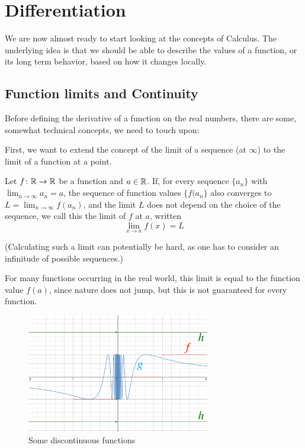 \chapter{Differentiation}
\label{chdiff}

We are now almost ready to start looking at the concepts of Calculus. The
underlying idea is that we should be able to describe the values of a
function, or its long term behavior, based on how it changes locally.

\section{Function limits and Continuity}

Before defining the derivative of a function on the real numbers, 
there are some, somewhat
technical concepts, we need to touch upon:

First, we want to extend the concept of the limit of a sequence (at
$\infty$) to the limit of a function at a point.
\begin{defn}
Let $f\colon{\mathbb R}\to{\mathbb R}$ be a function and $a\in{\mathbb R}$. If, for every sequence
$\{a_n\}$ with $\lim_{n\to\infty} a_n=a$, the sequence of function values
$\{f(a_n\}$ also converges to $L=\lim_{n\to\infty} f(a_n)$, and the limit
$L$ does not depend on the choice of the sequence, we call this the limit
of $f$ at $a$, written
\[
\lim_{x\to a} f(x)=L
\]
\end{defn}

(Calculating such a limit can potentially be hard, as one has to consider an
infinitude of possible sequences.)

For many functions occurring in the real world, this limit is equal to the
function value $f(a)$, since nature does not jump, but this is not
guaranteed for every function.

\begin{figure}[t]
\begin{center}
\includegraphics[width=8cm]{pic/DiscontFct.png}
\end{center}
\caption{Some discontinuous functions}
\label{figdiscont}
\end{figure}

